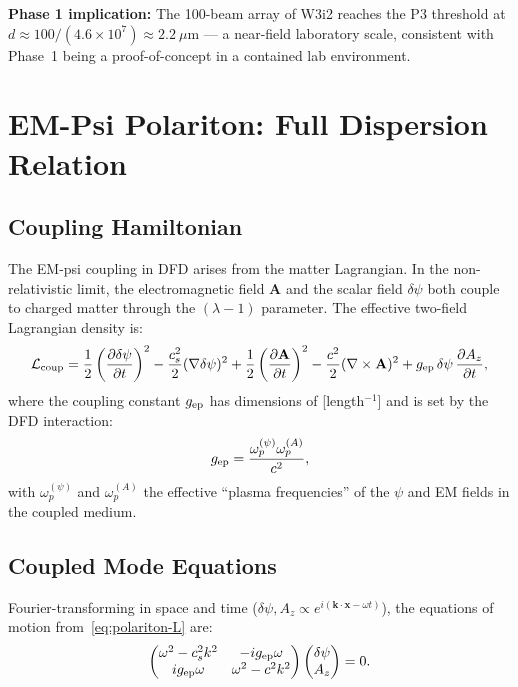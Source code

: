 \documentclass[aps,prd,twocolumn,superscriptaddress]{revtex4-2}
\begin{document}
\textbf{Phase 1 implication:} The 100-beam array of W3i2 reaches the
P3 threshold at $d \approx 100/(4.6\times10^7) \approx 2.2~\mu$m ---
a near-field laboratory scale, consistent with Phase~1 being a
proof-of-concept in a contained lab environment.

\section{EM-Psi Polariton: Full Dispersion Relation}
\label{sec:polariton}

\subsection{Coupling Hamiltonian}

The EM-psi coupling in DFD arises from the matter Lagrangian.  In the
non-relativistic limit, the electromagnetic field $\mathbf{A}$ and the
scalar field $\delta\psi$ both couple to charged matter through the
$(\lambda-1)$ parameter.  The effective two-field Lagrangian density is:
\begin{equation}
\mathcal{L}_{\rm coup} = \frac{1}{2}\left(\frac{\partial\delta\psi}{\partial t}\right)^2
- \frac{c_s^2}{2}(\nabla\delta\psi)^2
+ \frac{1}{2}\left(\frac{\partial\mathbf{A}}{\partial t}\right)^2
- \frac{c^2}{2}(\nabla\times\mathbf{A})^2
+ g_{\rm ep}\,\delta\psi\,\frac{\partial A_z}{\partial t},
\label{eq:polariton-L}
\end{equation}
where the coupling constant $g_{\rm ep}$ has dimensions of
[length$^{-1}$] and is set by the DFD interaction:
\begin{equation}
g_{\rm ep} = \frac{\omega_p^{(\psi)}\omega_p^{(A)}}{c^2},
\label{eq:g-ep}
\end{equation}
with $\omega_p^{(\psi)}$ and $\omega_p^{(A)}$ the effective
``plasma frequencies'' of the $\psi$ and EM fields in the coupled medium.

\subsection{Coupled Mode Equations}

Fourier-transforming in space and time ($\delta\psi, A_z \propto e^{i(\mathbf{k}\cdot\mathbf{x}-\omega t)}$),
the equations of motion from~\eqref{eq:polariton-L} are:
\begin{equation}
\begin{pmatrix}
\omega^2 - c_s^2 k^2 & -i g_{\rm ep}\omega \\
i g_{\rm ep}\omega   & \omega^2 - c^2 k^2
\end{pmatrix}
\begin{pmatrix}
\delta\psi \\ A_z
\end{pmatrix}
= 0.
\label{eq:coupled-mode}
\end{equation}
\end{document}
